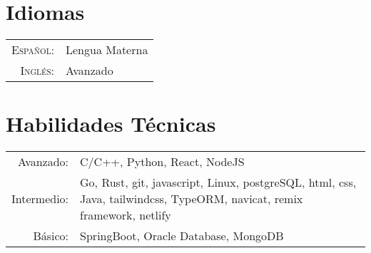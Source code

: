 \documentclass[a4paper,10pt]{article} %
\begin{document}
\section{Idiomas}

\begin{tabular}{rl}
    \textsc{Espa\~nol:} & Lengua Materna\\

    \textsc{Ingl\'es:} & Avanzado\\
\end{tabular}


\section{Habilidades T\'ecnicas}

\begin{tabular}{rl}
    Avanzado: & C/C++, Python, React, NodeJS\\
    Intermedio: & \parbox[t]{0.8\textwidth}{Go, Rust, git, javascript, Linux, postgreSQL, html, css, Java, tailwindcss, TypeORM, navicat, remix framework, netlify}\\
    B\'asico: & SpringBoot, Oracle Database, MongoDB
\end{tabular}


%

\end{document}
